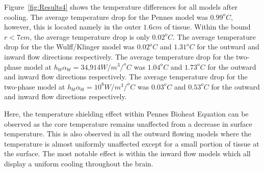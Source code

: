 \documentclass[11pt,english,a4paper,twoside,openright]{report}
\begin{document}
{{{{{{{{Figure~\ref{fig:Results4} shows the temperature differences for all models after cooling. The average temperature drop for the Pennes model was $0.99^{o}C$, however, this is located namely in the outer $1.6cm$ of tissue. Within the bound $r{<}7cm$, the average temperature drop is only $0.02^{o}C$. The average temperature drop for the the Wulff/Klinger model was $0.02^{o}C$ and $1.31^{o}C$ for the outward and inward flow directions respectively. The average temperature drop for the two-phase model at $h_{bt}\alpha_{bt} = \text{34,914}W/m^{3}/^{o}C$ was $1.04^{o}C$ and $1.73^{o}C$ for the outward and inward flow directions respectively. The average temperature drop for the two-phase model at $h_{bt}\alpha_{bt} = 10^{8}W/m^{3}/^{o}C$ was $0.03^{o}C$ and $0.53^{o}C$ for the outward and inward flow directions respectively.

Here, the temperature shielding effect within Pennes Bioheat Equation can be observed as the core temperature remains unaffected from a decrease in surface temperature. This is also observed in all the outward flowing models where the temperature is almost uniformly unaffected except for a small portion of tissue at the surface. The most notable effect is within the inward flow models which all display a uniform cooling throughout the brain. 

}}}}}}}}
\end{document}
